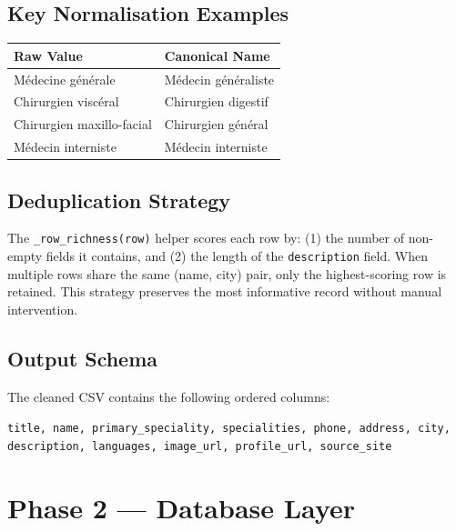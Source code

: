 \documentclass[12pt, a4paper]{article}
\newcommand{\func}[1]{\texttt{\color{danger}#1}}
\newcommand{\col}[1]{\texttt{\color{teal}#1}}
\begin{document}
\subsection{Key Normalisation Examples}

\begin{infobox}[title={Speciality Normalisation Samples}]
  \begin{tabular}{ll}
    \textbf{Raw Value} & \textbf{Canonical Name} \\
    \hline
    Médecine générale & Médecin généraliste \\
    Chirurgien viscéral & Chirurgien digestif \\
    Chirurgien maxillo-facial & Chirurgien général \\
    Médecin interniste & Médecin interniste \\
  \end{tabular}
\end{infobox}

\subsection{Deduplication Strategy}

The \func{\_row\_richness(row)} helper scores each row by: (1) the number of
non-empty fields it contains, and (2) the length of the \col{description} field.
When multiple rows share the same (name, city) pair, only the highest-scoring
row is retained. This strategy preserves the most informative record without
manual intervention.

\subsection{Output Schema}

The cleaned CSV contains the following ordered columns:

\begin{center}
  \small\texttt{title, name, primary\_speciality, specialities, phone,
  address, city, description, languages, image\_url, profile\_url, source\_site}
\end{center}

\section{Phase 2 — Database Layer}
\end{document}
